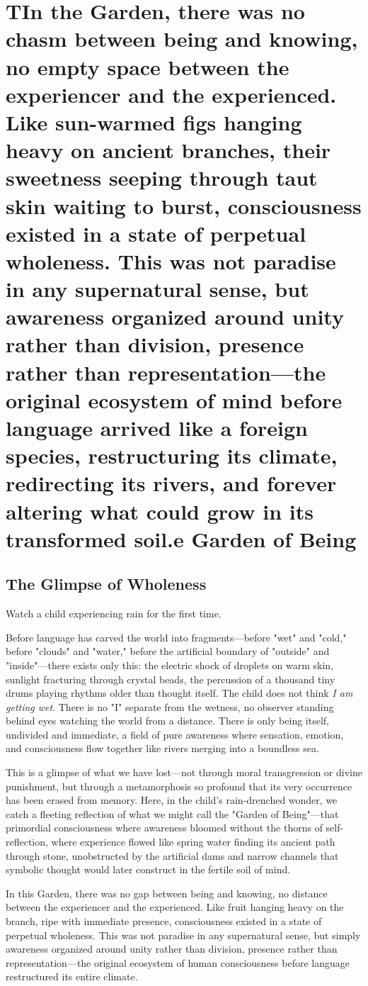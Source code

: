 \chapter{TIn the Garden, there was no chasm between being and knowing, no empty space between the experiencer and the experienced. Like sun-warmed figs hanging heavy on ancient branches, their sweetness seeping through taut skin waiting to burst, consciousness existed in a state of perpetual wholeness. This was not paradise in any supernatural sense, but awareness organized around unity rather than division, presence rather than representation—the original ecosystem of mind before language arrived like a foreign species, restructuring its climate, redirecting its rivers, and forever altering what could grow in its transformed soil.e Garden of Being}

\section{The Glimpse of Wholeness}

Watch a child experiencing rain for the first time. 

Before language has carved the world into fragments—before "wet" and "cold," before "clouds" and "water," before the artificial boundary of "outside" and "inside"—there exists only this: the electric shock of droplets on warm skin, sunlight fracturing through crystal beads, the percussion of a thousand tiny drums playing rhythms older than thought itself. The child does not think \textit{I am getting wet}. There is no "I" separate from the wetness, no observer standing behind eyes watching the world from a distance. There is only being itself, undivided and immediate, a field of pure awareness where sensation, emotion, and consciousness flow together like rivers merging into a boundless sea.

This is a glimpse of what we have lost—not through moral transgression or divine punishment, but through a metamorphosis so profound that its very occurrence has been erased from memory. Here, in the child's rain-drenched wonder, we catch a fleeting reflection of what we might call the "Garden of Being"—that primordial consciousness where awareness bloomed without the thorns of self-reflection, where experience flowed like spring water finding its ancient path through stone, unobstructed by the artificial dams and narrow channels that symbolic thought would later construct in the fertile soil of mind.

In this Garden, there was no gap between being and knowing, no distance between the experiencer and the experienced. Like fruit hanging heavy on the branch, ripe with immediate presence, consciousness existed in a state of perpetual wholeness. This was not paradise in any supernatural sense, but simply awareness organized around unity rather than division, presence rather than representation—the original ecosystem of human consciousness before language restructured its entire climate.

